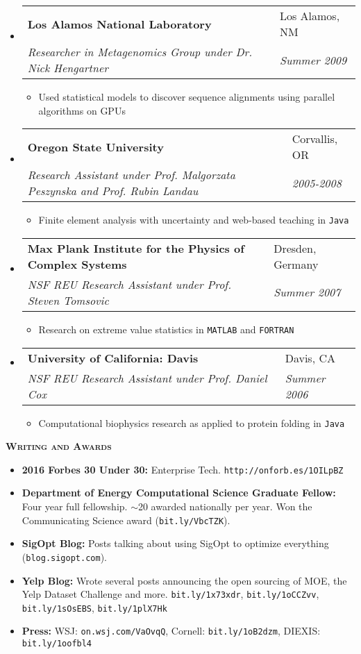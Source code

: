 \documentclass[letterpaper, 11pt]{article}
\makeatletter
\renewcommand{\section}[1]{%
  \begin{tcolorbox}
    \textsc{\textbf{\large{#1}}}
  \end{tcolorbox}
}
\newcommand{\entry}[4]{%
  \begin{tabularx}{\linewidth}{@{}Xl@{}}
    \textbf{#1} & #2          \\
    \textit{#3} & \textit{#4} \\
  \end{tabularx}
}
\makeatother
\begin{document}
\begin{itemize}
\item 
	\entry{Los Alamos National Laboratory}{Los Alamos, NM}{Researcher in Metagenomics Group under Dr. Nick Hengartner}{Summer 2009}
	\begin{itemize}
    \item{Used statistical models to discover sequence alignments using parallel algorithms on GPUs}
	\end{itemize}

\item
	\entry{Oregon State University}{Corvallis, OR}{Research Assistant under Prof. Malgorzata Peszynska and Prof. Rubin Landau}{2005-2008}
	\begin{itemize}
		\item{Finite element analysis with uncertainty and web-based teaching in \texttt{Java}}
	\end{itemize}

\item
	\entry{Max Plank Institute for the Physics of Complex Systems}{Dresden, Germany}{NSF REU Research Assistant under Prof. Steven Tomsovic}{Summer 2007}
	\begin{itemize}
		\item{Research on extreme value statistics in \texttt{MATLAB} and \texttt{FORTRAN}}
	\end{itemize}

\item
	\entry{University of California: Davis}{Davis, CA}{NSF REU Research Assistant under Prof. Daniel Cox}{Summer 2006}
	\begin{itemize}
		\item{Computational biophysics research as applied to protein folding in \texttt{Java}}
	\end{itemize}

\end{itemize}

\section{Writing and Awards}

\begin{itemize}

\item {\bf 2016 Forbes 30 Under 30:} Enterprise Tech. \texttt{http://onforb.es/1OILpBZ}
\item {\bf Department of Energy Computational Science Graduate Fellow:} Four year full fellowship. $\sim$20 awarded nationally per year. Won the Communicating Science award (\texttt{bit.ly/VbcTZK}).
\item {\bf SigOpt Blog:} Posts talking about using SigOpt to optimize everything (\texttt{blog.sigopt.com}).
\item {\bf Yelp Blog:} Wrote several posts announcing the open sourcing of MOE, the Yelp Dataset Challenge and more. \texttt{bit.ly/1x73xdr}, \texttt{bit.ly/1oCCZvv}, \texttt{bit.ly/1sOsEBS}, \texttt{bit.ly/1plX7Hk}
\item {\bf Press:} WSJ: \texttt{on.wsj.com/VaOvqQ}, Cornell: \texttt{bit.ly/1oB2dzm},  DIEXIS: \texttt{bit.ly/1oofbl4}

\end{itemize}
\end{document}
